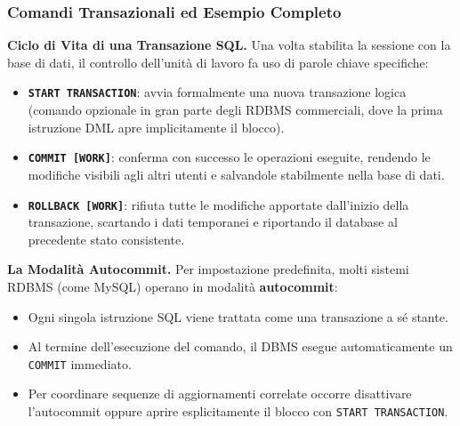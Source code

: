 \documentclass[12pt]{extarticle}
\begin{document}
\subsubsection{Comandi Transazionali ed Esempio Completo}
\noindent \textbf{Ciclo di Vita di una Transazione SQL.} Una volta stabilita la sessione con la base di dati, il controllo dell'unità di lavoro fa uso di parole chiave specifiche:
\begin{itemize}
    \item \textbf{\texttt{START TRANSACTION}}: avvia formalmente una nuova transazione logica (comando opzionale in gran parte degli RDBMS commerciali, dove la prima istruzione DML apre implicitamente il blocco).
    \item \textbf{\texttt{COMMIT [WORK]}}: conferma con successo le operazioni eseguite, rendendo le modifiche visibili agli altri utenti e salvandole stabilmente nella base di dati.
    \item \textbf{\texttt{ROLLBACK [WORK]}}: rifiuta tutte le modifiche apportate dall'inizio della transazione, scartando i dati temporanei e riportando il database al precedente stato consistente.
\end{itemize}

\medskip
\noindent \textbf{La Modalità Autocommit.} Per impostazione predefinita, molti sistemi RDBMS (come MySQL) operano in modalità \textbf{autocommit}:
\begin{itemize}
    \item Ogni singola istruzione SQL viene trattata come una transazione a sé stante.
    \item Al termine dell'esecuzione del comando, il DBMS esegue automaticamente un \texttt{COMMIT} immediato.
    \item Per coordinare sequenze di aggiornamenti correlate occorre disattivare l'autocommit oppure aprire esplicitamente il blocco con \texttt{START TRANSACTION}.
\end{itemize}
\end{document}
